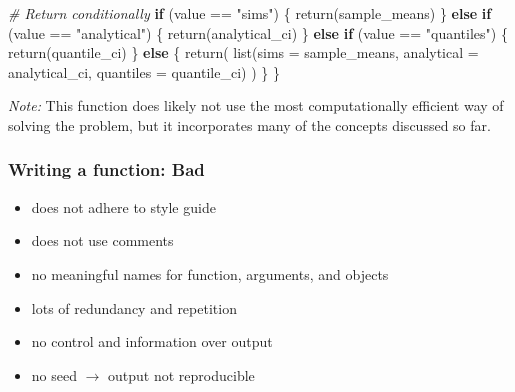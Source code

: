 \documentclass[
  11pt,
]{article}
\newenvironment{Shaded}{\begin{snugshade}}{\end{snugshade}}
\newcommand{\AttributeTok}[1]{\textcolor[rgb]{0.77,0.63,0.00}{#1}}
\newcommand{\CommentTok}[1]{\textcolor[rgb]{0.56,0.35,0.01}{\textit{#1}}}
\newcommand{\ControlFlowTok}[1]{\textcolor[rgb]{0.13,0.29,0.53}{\textbf{#1}}}
\newcommand{\FunctionTok}[1]{\textcolor[rgb]{0.00,0.00,0.00}{#1}}
\newcommand{\NormalTok}[1]{#1}
\newcommand{\SpecialCharTok}[1]{\textcolor[rgb]{0.00,0.00,0.00}{#1}}
\newcommand{\StringTok}[1]{\textcolor[rgb]{0.31,0.60,0.02}{#1}}
\providecommand{\tightlist}{%
  \setlength{\itemsep}{0pt}\setlength{\parskip}{0pt}}
\begin{document}
\begin{Shaded}
\begin{Highlighting}[]
  \CommentTok{\# Return conditionally}
  \ControlFlowTok{if}\NormalTok{ (value }\SpecialCharTok{==} \StringTok{"sims"}\NormalTok{) \{}
    \FunctionTok{return}\NormalTok{(sample\_means)}
\NormalTok{  \} }\ControlFlowTok{else} \ControlFlowTok{if}\NormalTok{ (value }\SpecialCharTok{==} \StringTok{"analytical"}\NormalTok{) \{}
    \FunctionTok{return}\NormalTok{(analytical\_ci)}
\NormalTok{  \} }\ControlFlowTok{else} \ControlFlowTok{if}\NormalTok{ (value }\SpecialCharTok{==} \StringTok{"quantiles"}\NormalTok{) \{}
    \FunctionTok{return}\NormalTok{(quantile\_ci)}
\NormalTok{  \} }\ControlFlowTok{else}\NormalTok{ \{}
    \FunctionTok{return}\NormalTok{(}
      \FunctionTok{list}\NormalTok{(}\AttributeTok{sims =}\NormalTok{ sample\_means, }
           \AttributeTok{analytical =}\NormalTok{ analytical\_ci,}
           \AttributeTok{quantiles =}\NormalTok{ quantile\_ci)}
\NormalTok{      )}
\NormalTok{  \}}
\NormalTok{\}}
\end{Highlighting}
\end{Shaded}

\emph{Note:} This function does likely not use the most computationally efficient way of solving the problem, but it incorporates many of the concepts discussed so far.

\hypertarget{writing-a-function-bad}{%
\subsubsection{Writing a function: Bad}\label{writing-a-function-bad}}

\begin{itemize}
\tightlist
\item
  does not adhere to style guide
\item
  does not use comments
\item
  no meaningful names for function, arguments, and objects
\item
  lots of redundancy and repetition
\item
  no control and information over output
\item
  no seed \(\rightarrow\) output not reproducible
\end{itemize}
\end{document}
